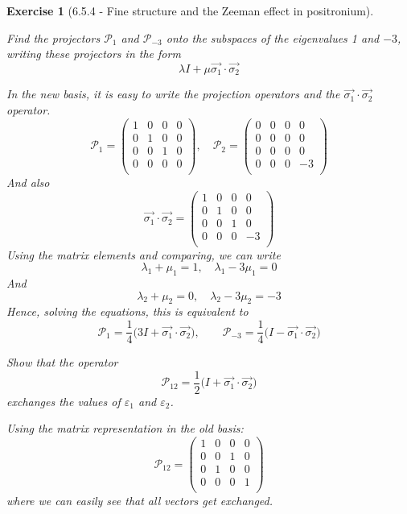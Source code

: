 \documentclass[12pt]{article}
\def\be{\begin{equation}}
\def\ee{\end{equation}}
\def\f{\frac}
\newtheorem{exercise}{Exercise}
\begin{document}
\begin{exercise}[6.5.4 - Fine structure and the Zeeman effect in positronium]
\begin{exercises}
			\item Find the projectors $\mathcal{P}_1$ and $\mathcal{P}_{-3}$ onto the subspaces of the eigenvalues 1 and $-3$, writing these
			projectors in the form
			\be
				\lambda I + \mu\vec{\sigma_1}\cdot\vec{\sigma_2}
			\ee
			\begin{multianswer}
				In the new basis, it is easy to write the projection operators and the $\vec{\sigma_1}\cdot\vec{\sigma_2}$ operator.
				\be
					\mathcal{P}_1 = 
					\begin{pmatrix}
						1 & 0 & 0 & 0 \\
						0 & 1 & 0 & 0 \\
						0 & 0 & 1 & 0 \\
						0 & 0 & 0 & 0 \\
					\end{pmatrix}, \quad
					\mathcal{P}_2 = 
					\begin{pmatrix}
						0 & 0 & 0 & 0 \\
						0 & 0 & 0 & 0 \\
						0 & 0 & 0 & 0 \\
						0 & 0 & 0 & -3 \\
					\end{pmatrix}
				\ee
				And also
				\be
					\vec{\sigma_1}\cdot\vec{\sigma_2} = 
					\begin{pmatrix}
						1 & 0 & 0 & 0 \\
						0 & 1 & 0 & 0 \\
						0 & 0 & 1 & 0 \\
						0 & 0 & 0 & -3 \\
					\end{pmatrix}
				\ee
				Using the matrix elements and comparing, we can write
				\be
					\lambda_1 + \mu_1 = 1, \quad \lambda_1 - 3\mu_1 = 0
				\ee
				And
				\be
					\lambda_2 + \mu_2 = 0, \quad \lambda_2 - 3\mu_2 = -3
				\ee
				Hence, solving the equations, this is equivalent to
				\be
					\mathcal{P}_1 = \f{1}{4}\Big( 3I + \vec{\sigma_1}\cdot\vec{\sigma_2} \Big), \quad\quad \mathcal{P}_{-3} = \f{1}{4}\Big( I - \vec{\sigma_1}\cdot\vec{\sigma_2} \Big)
				\ee
			\end{multianswer}
			
			\item Show that the operator 
			\be
				\mathcal{P}_{12} = \f{1}{2}\Big( I + \vec{\sigma_1}\cdot\vec{\sigma_2} \Big)
			\ee
			exchanges the values of $\varepsilon_1$ and $\varepsilon_2$.
			\begin{multianswer}
				Using the matrix representation in the old basis:
				\be
					\mathcal{P}_{12} = 
					\begin{pmatrix}
						1 & 0 & 0 & 0 \\
						0 & 0 & 1 & 0 \\
						0 & 1 & 0 & 0 \\
						0 & 0 & 0 & 1 \\
					\end{pmatrix}
				\ee
				where we can easily see that all vectors get exchanged. 
			\end{multianswer}
			

\end{exercises}
\end{exercise}
\end{document}
